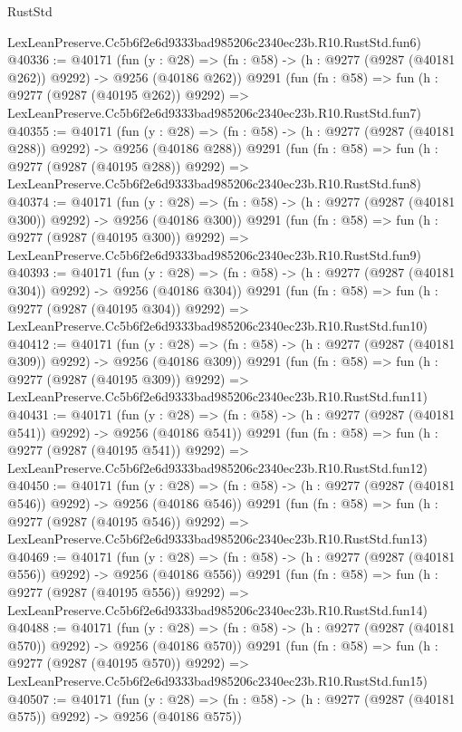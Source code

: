 \begin{lexlean}{RustStd}
\begin{coremodule}
    LexLeanPreserve.Cc5b6f2e6d9333bad985206c2340ec23b.R10.RustStd.fun6)
@40336 := @40171
    (fun (y : @28) => (fn : @58) -> (h : @9277 (@9287 (@40181 @262)) @9292) -> @9256 (@40186 @262))
    @9291
    (fun (fn : @58) =>
    fun (h : @9277 (@9287 (@40195 @262)) @9292) =>
    LexLeanPreserve.Cc5b6f2e6d9333bad985206c2340ec23b.R10.RustStd.fun7)
@40355 := @40171
    (fun (y : @28) => (fn : @58) -> (h : @9277 (@9287 (@40181 @288)) @9292) -> @9256 (@40186 @288))
    @9291
    (fun (fn : @58) =>
    fun (h : @9277 (@9287 (@40195 @288)) @9292) =>
    LexLeanPreserve.Cc5b6f2e6d9333bad985206c2340ec23b.R10.RustStd.fun8)
@40374 := @40171
    (fun (y : @28) => (fn : @58) -> (h : @9277 (@9287 (@40181 @300)) @9292) -> @9256 (@40186 @300))
    @9291
    (fun (fn : @58) =>
    fun (h : @9277 (@9287 (@40195 @300)) @9292) =>
    LexLeanPreserve.Cc5b6f2e6d9333bad985206c2340ec23b.R10.RustStd.fun9)
@40393 := @40171
    (fun (y : @28) => (fn : @58) -> (h : @9277 (@9287 (@40181 @304)) @9292) -> @9256 (@40186 @304))
    @9291
    (fun (fn : @58) =>
    fun (h : @9277 (@9287 (@40195 @304)) @9292) =>
    LexLeanPreserve.Cc5b6f2e6d9333bad985206c2340ec23b.R10.RustStd.fun10)
@40412 := @40171
    (fun (y : @28) => (fn : @58) -> (h : @9277 (@9287 (@40181 @309)) @9292) -> @9256 (@40186 @309))
    @9291
    (fun (fn : @58) =>
    fun (h : @9277 (@9287 (@40195 @309)) @9292) =>
    LexLeanPreserve.Cc5b6f2e6d9333bad985206c2340ec23b.R10.RustStd.fun11)
@40431 := @40171
    (fun (y : @28) => (fn : @58) -> (h : @9277 (@9287 (@40181 @541)) @9292) -> @9256 (@40186 @541))
    @9291
    (fun (fn : @58) =>
    fun (h : @9277 (@9287 (@40195 @541)) @9292) =>
    LexLeanPreserve.Cc5b6f2e6d9333bad985206c2340ec23b.R10.RustStd.fun12)
@40450 := @40171
    (fun (y : @28) => (fn : @58) -> (h : @9277 (@9287 (@40181 @546)) @9292) -> @9256 (@40186 @546))
    @9291
    (fun (fn : @58) =>
    fun (h : @9277 (@9287 (@40195 @546)) @9292) =>
    LexLeanPreserve.Cc5b6f2e6d9333bad985206c2340ec23b.R10.RustStd.fun13)
@40469 := @40171
    (fun (y : @28) => (fn : @58) -> (h : @9277 (@9287 (@40181 @556)) @9292) -> @9256 (@40186 @556))
    @9291
    (fun (fn : @58) =>
    fun (h : @9277 (@9287 (@40195 @556)) @9292) =>
    LexLeanPreserve.Cc5b6f2e6d9333bad985206c2340ec23b.R10.RustStd.fun14)
@40488 := @40171
    (fun (y : @28) => (fn : @58) -> (h : @9277 (@9287 (@40181 @570)) @9292) -> @9256 (@40186 @570))
    @9291
    (fun (fn : @58) =>
    fun (h : @9277 (@9287 (@40195 @570)) @9292) =>
    LexLeanPreserve.Cc5b6f2e6d9333bad985206c2340ec23b.R10.RustStd.fun15)
@40507 := @40171
    (fun (y : @28) => (fn : @58) -> (h : @9277 (@9287 (@40181 @575)) @9292) -> @9256 (@40186 @575))

\end{coremodule}
\end{lexlean}
